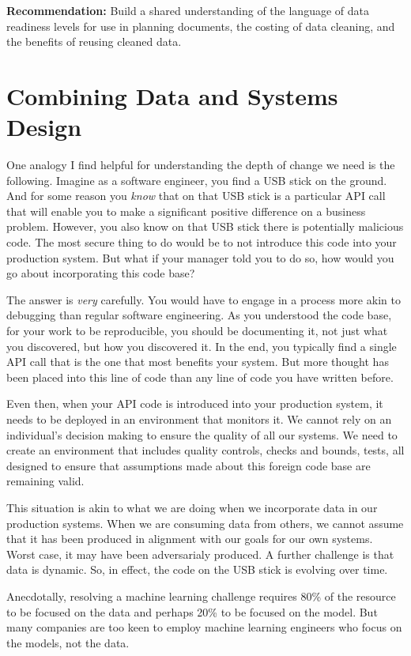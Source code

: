 \documentclass[a4paper]{caesar_book}
\begin{document}
\textbf{Recommendation:} Build a shared understanding of the language of data readiness levels for use in planning documents, the costing of data cleaning, and the benefits of reusing cleaned data.

\section{Combining Data and Systems Design}

One analogy I find helpful for understanding the depth of change we need is the following. Imagine as a software engineer, you find a USB stick on the ground. And for some reason you \textit{know} that on that USB stick is a particular API call that will enable you to make a significant positive difference on a business problem. However, you also know on that USB stick there is potentially malicious code. The most secure thing to do would be to not introduce this code into your production system. But what if your manager told you to do so, how would you go about incorporating this code base?

The answer is \textit{very} carefully. You would have to engage in a process more akin to debugging than regular software engineering. As you understood the code base, for your work to be reproducible, you should be documenting it, not just what you discovered, but how you discovered it. In the end, you typically find a single API call that is the one that most benefits your system. But more thought has been placed into this line of code than any line of code you have written before.

Even then, when your API code is introduced into your production system, it needs to be deployed in an environment that monitors it. We cannot rely on an individual’s decision making to ensure the quality of all our systems. We need to create an environment that includes quality controls, checks and bounds, tests, all designed to ensure that assumptions made about this foreign code base are remaining valid.

This situation is akin to what we are doing when we incorporate data in our production systems. When we are consuming data from others, we cannot assume that it has been produced in alignment with our goals for our own systems. Worst case, it may have been adversarialy produced. A further challenge is that data is dynamic. So, in effect, the code on the USB stick is evolving over time.

Anecdotally, resolving a machine learning challenge requires 80\% of the resource to be focused on the data and perhaps 20\% to be focused on the model. But many companies are too keen to employ machine learning engineers who focus on the models, not the data.
\end{document}
